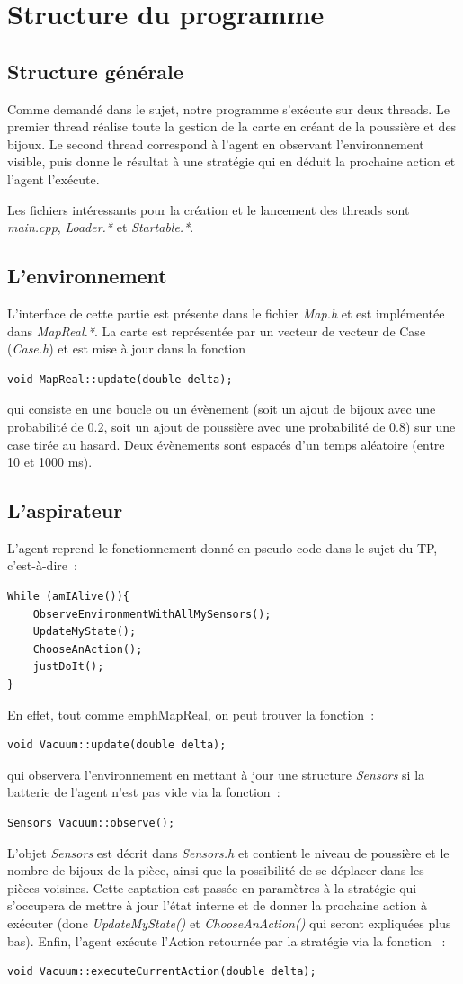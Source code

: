 \documentclass{article}
\begin{document}
\section{Structure du programme}
\subsection{Structure générale}
Comme demandé dans le sujet, notre programme s'exécute sur deux threads. Le premier thread réalise toute la gestion de la carte en créant de la poussière et des bijoux. Le second thread correspond à l'agent en observant l'environnement visible, puis donne le résultat à une stratégie qui en déduit la prochaine action et l'agent l'exécute.

Les fichiers intéressants pour la création et le lancement des threads sont \emph{main.cpp}, \emph{Loader.*} et \emph{Startable.*}.
\subsection{L'environnement}
L'interface de cette partie est présente dans le fichier \emph{Map.h} et est implémentée dans \emph{MapReal.*}. La carte est représentée par un vecteur de vecteur de Case (\emph{Case.h}) et est mise à jour dans la fonction \begin{verbatim}
void MapReal::update(double delta);
\end{verbatim}
qui consiste en une boucle ou un évènement (soit un ajout de bijoux avec une probabilité de 0.2, soit un ajout de poussière avec une probabilité de 0.8) sur une case tirée au hasard. Deux évènements sont espacés d'un temps aléatoire (entre 10 et 1000 ms).
\subsection{L'aspirateur}
L'agent reprend le fonctionnement donné en pseudo-code dans le sujet du TP, c'est-à-dire~:
\begin{verbatim}
While (amIAlive()){
    ObserveEnvironmentWithAllMySensors();
    UpdateMyState();
    ChooseAnAction();
    justDoIt();
}
\end{verbatim}
En effet, tout comme emph{MapReal}, on peut trouver la fonction~:
\begin{verbatim}
void Vacuum::update(double delta);
\end{verbatim}
qui observera l'environnement en mettant à jour une structure \emph{Sensors} si la batterie de l'agent n'est pas vide via la fonction~:
\begin{verbatim}
Sensors Vacuum::observe();
\end{verbatim}
L'objet \emph{Sensors} est décrit dans \emph{Sensors.h} et contient le niveau de poussière et le nombre de bijoux de la pièce, ainsi que la possibilité de se déplacer dans les pièces voisines. Cette captation est passée en paramètres à la stratégie qui s'occupera de mettre à jour l'état interne et de donner la prochaine action à exécuter (donc \emph{UpdateMyState()} et \emph{ChooseAnAction()} qui seront expliquées plus bas). Enfin, l'agent exécute l'Action retournée par la stratégie via la fonction ~:
\begin{verbatim}
void Vacuum::executeCurrentAction(double delta);
\end{verbatim}
\end{document}
